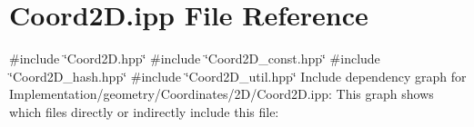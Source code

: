\hypertarget{Implementation_2geometry_2Coordinates_22D_2Coord2D_8ipp}{}\section{Coord2\+D.\+ipp File Reference}
\label{Implementation_2geometry_2Coordinates_22D_2Coord2D_8ipp}
{\ttfamily \#include \char`\"{}Coord2\+D.\+hpp\char`\"{}}\newline
{\ttfamily \#include \char`\"{}Coord2\+D\+\_\+const.\+hpp\char`\"{}}\newline
{\ttfamily \#include \char`\"{}Coord2\+D\+\_\+hash.\+hpp\char`\"{}}\newline
{\ttfamily \#include \char`\"{}Coord2\+D\+\_\+util.\+hpp\char`\"{}}\newline
Include dependency graph for Implementation/geometry/\+Coordinates/2\+D/\+Coord2D.ipp\+:
This graph shows which files directly or indirectly include this file\+:
